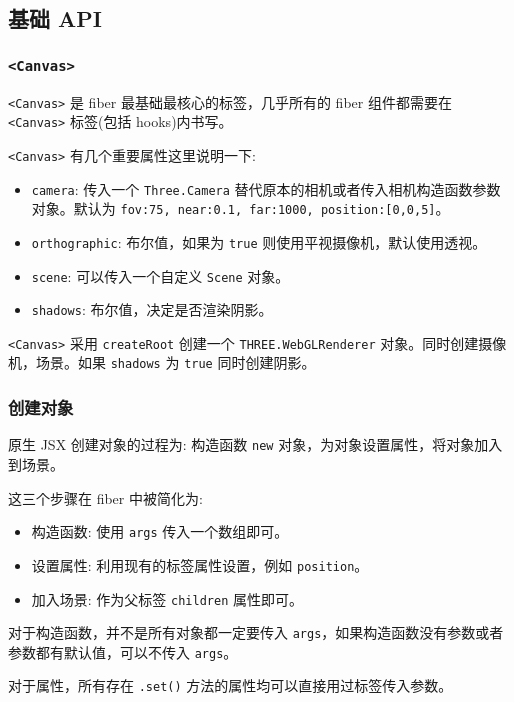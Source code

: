 \subsection{基础 API}

\subsubsection*{\texttt{<Canvas>}}

\texttt{<Canvas>} 是 fiber 最基础最核心的标签，几乎所有的 fiber 组件都需要在 \texttt{<Canvas>} 标签(包括 hooks)内书写。

\texttt{<Canvas>} 有几个重要属性这里说明一下:
\begin{itemize}
  \item \texttt{camera}: 传入一个 \texttt{Three.Camera} 替代原本的相机或者传入相机构造函数参数对象。默认为 \texttt{{fov:75, near:0.1, far:1000, position:[0,0,5]}}。
  \item \texttt{orthographic}: 布尔值，如果为 \texttt{true} 则使用平视摄像机，默认使用透视。
  \item \texttt{scene}: 可以传入一个自定义 \texttt{Scene} 对象。
  \item \texttt{shadows}: 布尔值，决定是否渲染阴影。
\end{itemize}

\texttt{<Canvas>} 采用 \texttt{createRoot} 创建一个 \texttt{THREE.WebGLRenderer} 对象。同时创建摄像机，场景。如果 \texttt{shadows} 为 \texttt{true} 同时创建阴影。

\subsubsection*{创建对象}

原生 JSX 创建对象的过程为: 构造函数 \texttt{new} 对象，为对象设置属性，将对象加入到场景。

这三个步骤在 fiber 中被简化为:
\begin{itemize}
  \item 构造函数: 使用 \texttt{args} 传入一个数组即可。
  \item 设置属性: 利用现有的标签属性设置，例如 \texttt{position}。
  \item 加入场景: 作为父标签 \texttt{children} 属性即可。
\end{itemize}

对于构造函数，并不是所有对象都一定要传入 \texttt{args}，如果构造函数没有参数或者参数都有默认值，可以不传入 \texttt{args}。

对于属性，所有存在 \texttt{.set()} 方法的属性均可以直接用过标签传入参数。

